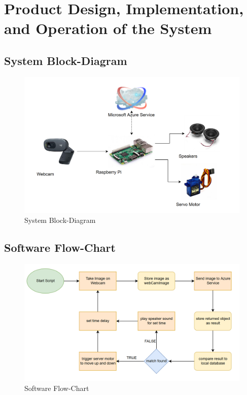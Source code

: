\documentclass[a4paper,12pt]{article}
\begin{document}
\newpage
\section{Product Design, Implementation, and Operation of the System}
\subsection{System Block-Diagram}
\begin{figure}[h]
    \centering
    \includegraphics[width = \linewidth]{../images/BlockDiagram.png}
    \caption{System Block-Diagram}
\end{figure}


\newpage
\subsection{Software Flow-Chart}
\begin{figure}[h]
    \centering
    \includegraphics[width = \linewidth]{../images/FlowChart.png}
    \caption{Software Flow-Chart}
\end{figure}
\end{document}
